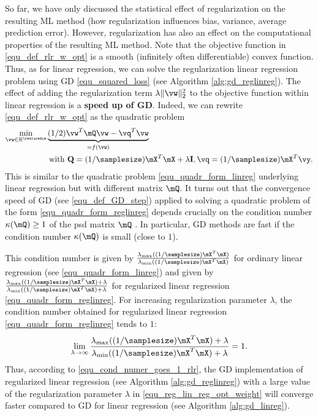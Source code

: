 \documentclass[12pt]{report}
\begin{document}
So far, we have only discussed the statistical effect of regularization on the resulting ML method (how 
regularization influences bias, variance, average prediction error). However, regularization has also 
an effect on the computational properties of the resulting ML method. Note that the objective function 
in \eqref{equ_def_rlr_w_opt} is a smooth (infinitely often differentiable) convex function. Thus, as for 
linear regression, we can solve the regularization linear regression problem using GD \eqref{equ_squared_loss} 
(see Algorithm \ref{alg:gd_reglinreg}). The effect of adding the regularization term $\lambda \| \vw \|^{2}_{2}$ 
to the objective function within linear regression is a {\bf speed up of GD}. Indeed, we can rewrite \eqref{equ_def_rlr_w_opt} 
as the quadratic problem 
\begin{align} 
\label{equ_quadr_form_reglinreg}
\min_{\vw \in \mathbb{R}^{\featuredim}} & \underbrace{(1/2) \vw^{T} \mQ \vw - \vq^{T}  \vw}_{= f(\vw)} \nonumber \\ 
 & \mbox{ with } \mathbf{Q}= (1/\samplesize) \mX^{T} \mX + \lambda \mathbf{I}, \vq =(1/\samplesize) \mX^{T} \vy. %
\end{align} 
This is similar to the quadratic problem \eqref{equ_quadr_form_linreg} underlying linear regression but 
with different matrix $\mQ$. It turns out that the convergence speed of GD (see \eqref{equ_def_GD_step}) 
applied to solving a quadratic problem of the form \eqref{equ_quadr_form_reglinreg} depends crucially 
on the condition number $\kappa(\mQ) \geq 1$ of the psd matrix $\mQ$ \cite{JungFixedPoint}. In particular, 
GD methods are fast if the condition number $\kappa(\mQ)$ is small (close to $1$). 

This condition number is given by $\frac{\lambda_{\rm max}((1/\samplesize) \mX^{T} \mX)} {\lambda_{\rm min}((1/\samplesize) \mX^{T} \mX)}$ for ordinary linear regression 
(see \eqref{equ_quadr_form_linreg}) and given by $\frac{\lambda_{\rm max}((1/\samplesize)\mX^{T} \mX) + \lambda} {\lambda_{\rm min}((1/\samplesize)\mX^{T} \mX)+ \lambda}$ 
for regularized linear regression \eqref{equ_quadr_form_reglinreg}. For increasing regularization parameter $\lambda$, the condition number 
obtained for regularized linear regression \eqref{equ_quadr_form_reglinreg} tends to $1$: 
\begin{equation}
\label{equ_cond_numer_goes_1_rlr}
\lim_{\lambda \rightarrow \infty} \frac{\lambda_{\rm max}((1/\samplesize)\mX^{T} \mX) + \lambda} {\lambda_{\rm min}((1/\samplesize)\mX^{T} \mX)+ \lambda} =1. 
\end{equation} 
Thus, according to \eqref{equ_cond_numer_goes_1_rlr}, the GD implementation of regularized linear 
regression (see Algorithm \ref{alg:gd_reglinreg}) with a large value of the regularization parameter 
$\lambda$ in \eqref{equ_reg_lin_reg_opt_weight} will converge faster compared to GD for linear 
regression (see Algorithm \ref{alg:gd_linreg}). 
\end{document}
